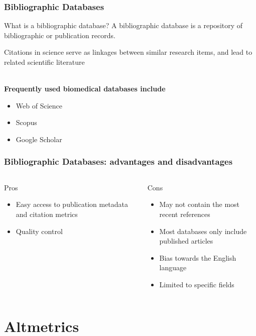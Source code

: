 \documentclass{beamer}
\newcommand{\pros}{\item[{\textcolor[HTML]{3C8031}{\ding{51}}}]}
\newcommand{\cons}{\item[\textcolor{red}{\ding{54}}]}
\begin{document}
\begin{frame}
    \frametitle{Bibliographic Databases}

    \begin{block}{What is a bibliographic database?}
        A bibliographic database is a repository of bibliographic or publication records.
    \end{block}

    Citations in science serve as linkages between similar research items, and lead to related scientific literature\\~\

    \textbf{Frequently used biomedical databases include}
    \begin{itemize}
        \item Web of Science
        \item Scopus
        \item Google Scholar
    \end{itemize}
\end{frame}

\begin{frame}
    \frametitle{Bibliographic Databases: advantages and disadvantages}
    \begin{columns}[T]
        \begin{column}{.5\textwidth}
            \centering Pros
            \begin{itemize}[<+->]
                \pros Easy access to publication metadata and citation metrics
                \pros Quality control
            \end{itemize}
        \end{column}
        \begin{column}{.5\textwidth}
            \centering Cons
            \begin{itemize}[<+->]
                \cons May not contain the most recent references
                \cons Most databases only include published articles
                \cons Bias towards the English language
                \cons Limited to specific fields
            \end{itemize}
        \end{column}
    \end{columns}
\end{frame}

\section{Altmetrics}
\end{document}
